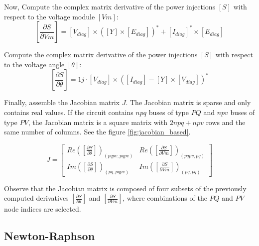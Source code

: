 \documentclass[nols,a4paper,twoside,notoc,fleqn]{tufte-book}
\begin{document}

Now, Compute the complex matrix derivative of the power injections $[S]$ with respect to the voltage module $[Vm]$:
\begin{equation}
\left[\frac{\partial S}{\partial Vm}\right] = [V_{diag}] \times \left([Y] \times [E_{diag}] \right)^* + [I_{diag}]^* \times  [E_{diag}]
\end{equation}
    
Compute the complex matrix derivative of the power injections $[S]$ with respect to the voltage angle $[\theta]$:
\begin{equation}
\left[\frac{\partial S}{\partial \theta}\right] = 1j \cdot [V_{diag}] \times  \left([I_{diag}] - [Y] \times [V_{diag}] \right)^*
\end{equation}

Finally, assemble the Jacobian matrix $J$. The Jacobian matrix is sparse and only contains real values. If the circuit contains $npq$ buses of type $PQ$ and $npv$ buses of type $PV$, the Jacobian matrix is a square matrix with $2 npq + npv$ rows and the same number of columns. See the figure \ref{fig:jacobian_based}.


\begin{equation}
J=
\left[
\begin{array}{cc}
Re\left(\left[\frac{\partial S}{\partial \theta}\right]\right)_{(pqpv, pqpv)} &
Re\left(\left[\frac{\partial S}{\partial Vm}\right]\right)_{(pqpv, pq)} \\
Im\left(\left[\frac{\partial S}{\partial \theta}\right]\right)_{(pq, pqpv)} &
Im\left(\left[\frac{\partial S}{\partial Vm}\right]\right)_{(pq,pq)}
\end{array}
\right]
\end{equation}

Observe that the Jacobian matrix is composed of four subsets of the previously computed derivatives $\left[\frac{\partial S}{\partial \theta}\right]$ and $\left[\frac{\partial S}{\partial Vm}\right]$, where combinations of the $PQ$ and $PV$ node indices are selected.


\newpage
\subsection{Newton-Raphson}
\end{document}
